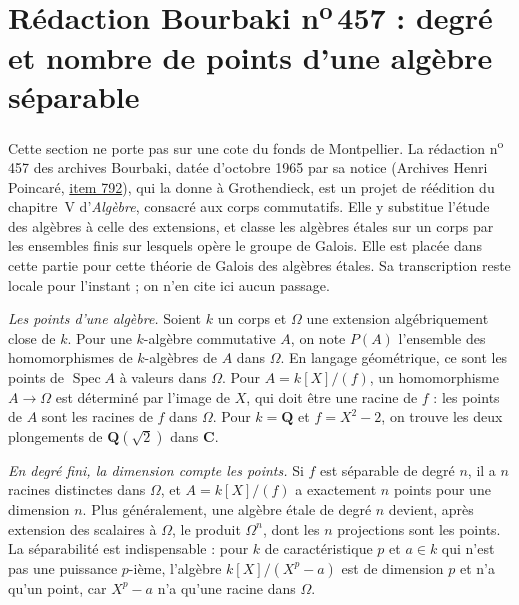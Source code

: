 \section[Rédaction Bourbaki n\textsuperscript{o}\,457 : degré et nombre de points]{Rédaction Bourbaki n\textsuperscript{o}\,457 : degré et nombre de points d'une algèbre séparable\protect{}}\label{sec:bourbaki-457}

Cette section ne porte pas sur une cote du fonds de Montpellier. La rédaction n\textsuperscript{o}\,457 des archives Bourbaki, datée d'octobre 1965 par sa notice (Archives Henri Poincaré, \href{https://archives-bourbaki.ahp-numerique.fr/items/show/792}{item 792}), qui la donne à Grothendieck, est un projet de réédition du chapitre~V d'\emph{Algèbre}, consacré aux corps commutatifs. Elle y substitue l'étude des algèbres à celle des extensions, et classe les algèbres étales sur un corps par les ensembles finis sur lesquels opère le groupe de Galois. Elle est placée dans cette partie pour cette théorie de Galois des algèbres étales. Sa transcription reste locale pour l'instant ; on n'en cite ici aucun passage.

\emph{Les points d'une algèbre.} Soient $k$ un corps et $\Omega$ une extension algébriquement close de $k$. Pour une $k$-algèbre commutative $A$, on note $P(A)$ l'ensemble des homomorphismes de $k$-algèbres de $A$ dans $\Omega$. En langage géométrique, ce sont les points de $\operatorname{Spec} A$ à valeurs dans $\Omega$. Pour $A = k[X]/(f)$, un homomorphisme $A \to \Omega$ est déterminé par l'image de $X$, qui doit être une racine de $f$ : les points de $A$ sont les racines de $f$ dans $\Omega$. Pour $k = \mathbf Q$ et $f = X^2 - 2$, on trouve les deux plongements de $\mathbf Q(\sqrt 2)$ dans $\mathbf C$.

\emph{En degré fini, la dimension compte les points.} Si $f$ est séparable de degré $n$, il a $n$ racines distinctes dans $\Omega$, et $A = k[X]/(f)$ a exactement $n$ points pour une dimension $n$. Plus généralement, une algèbre étale de degré $n$ devient, après extension des scalaires à $\Omega$, le produit $\Omega^n$, dont les $n$ projections sont les points. La séparabilité est indispensable : pour $k$ de caractéristique $p$ et $a \in k$ qui n'est pas une puissance $p$-ième, l'algèbre $k[X]/(X^p - a)$ est de dimension $p$ et n'a qu'un point, car $X^p - a$ n'a qu'une racine dans $\Omega$.

